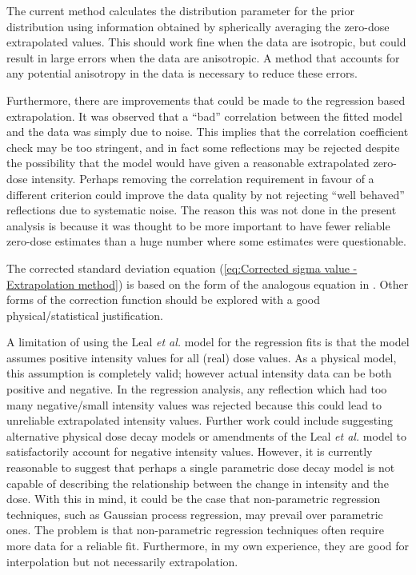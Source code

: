 The current method calculates the distribution parameter for the prior distribution using information obtained by spherically averaging the zero-dose extrapolated values. This should work fine when the data are isotropic, but could result in large errors when the data are anisotropic. A method that accounts for any potential anisotropy in the data is necessary to reduce these errors.

Furthermore, there are improvements that could be made to the regression based extrapolation.
It was observed that a ``bad'' correlation between the fitted model and the data was simply due to noise.
This implies that the correlation coefficient check may be too stringent, and in fact some reflections may be rejected despite the possibility that the model would have given a reasonable extrapolated zero-dose intensity.
Perhaps removing the correlation requirement in favour of a different criterion could improve the data quality by not rejecting ``well behaved'' reflections due to systematic noise.
The reason this was not done in the present analysis is because it was thought to be more important to have fewer reliable zero-dose estimates than a huge number where some estimates were questionable.

The corrected standard deviation equation (\ref{eq:Corrected sigma value - Extrapolation method}) is based on the form of the analogous equation in \cite{diederichs2003}.
Other forms of the correction function should be explored with a good physical/statistical justification.

A limitation of using the Leal \textit{et al.} model for the regression fits is that the model assumes positive intensity values for all (real) dose values.
As a physical model, this assumption is completely valid; however actual intensity data can be both positive and negative.
In the regression analysis, any reflection which had too many negative/small intensity values was rejected because this could lead to unreliable extrapolated intensity values.
Further work could include suggesting alternative physical dose decay models or amendments of the Leal \textit{et al.} model to satisfactorily account for negative intensity values.
However, it is currently reasonable to suggest that perhaps a single parametric dose decay model is not capable of describing the relationship between the change in intensity and the dose.
With this in mind, it could be the case that non-parametric regression techniques, such as Gaussian process regression, may prevail over parametric ones.
The problem is that non-parametric regression techniques often require more data for a reliable fit.
Furthermore, in my own experience, they are good for interpolation but not necessarily extrapolation.

